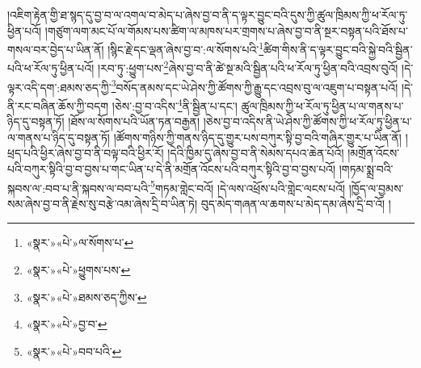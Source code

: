 །འཇིག་རྟེན་གྱི་ཐ་སྙད་དུ་བྱ་བ་ལ་འགལ་བ་མེད་པ་ཞེས་བྱ་བ་ནི་ད་ལྟར་བྱུང་བའི་དུས་ཀྱི་ཚུལ་ཁྲིམས་ཀྱི་ཕ་རོལ་ཏུ་ཕྱིན་པའོ། །གཙུག་ལག་མང་པོ་ལ་གོམས་པས་ཚིག་ལ་མཁས་པར་གྲགས་པ་ཞེས་བྱ་བ་ནི་སྔར་བསྟན་པའི་ཐོས་པ་གསལ་བར་བྱེད་པ་ཡིན་ནོ། །སྙིང་རྗེ་དང་ལྡན་ཞེས་བྱ་བ་:ལ་སོགས་པའི་\footnote{«སྣར་»«པེ་»ལ་སོགས་པ་}ཚིག་གིས་ནི་ད་ལྟར་བྱུང་བའི་སྐྱེ་བའི་སྦྱིན་པའི་ཕ་རོལ་ཏུ་ཕྱིན་པའོ། །རབ་ཏུ་:ཕྱུག་པས་\footnote{«སྣར་»«པེ་»ཕྱུགས་པས་}ཞེས་བྱ་བ་ནི་ཚེ་སྔ་མའི་སྦྱིན་པའི་ཕ་རོལ་ཏུ་ཕྱིན་བའི་འབྲས་བུའོ། །དེ་ལྟར་འདི་དག་:ཐམས་ཅད་ཀྱི་\footnote{«སྣར་»«པེ་»ཐམས་ཅད་ཀྱིས་}བསོད་ནམས་དང་ཡེ་ཤེས་ཀྱི་ཚོགས་ཀྱི་རྒྱུ་དང་འབྲས་བུ་ལ་འཇུག་པ་བསྟན་པའོ། །དེ་ནི་རང་བཞིན་ཆོས་ཀྱི་བདག །ཅེས་:བྱ་བ་འདིས་\footnote{«སྣར་»«པེ་»བྱ་བ་}ནི་སྦྱིན་པ་དང་། ཚུལ་ཁྲིམས་ཀྱི་ཕ་རོལ་ཏུ་ཕྱིན་པ་ལ་གནས་པ་ཉིད་དུ་བསྟན་ཏོ། །ཐོས་ལ་སོགས་པའི་ཡོན་ཏན་བརྒྱན། །ཅེས་བྱ་བ་འདིས་ནི་ཡེ་ཤེས་ཀྱི་ཚོགས་ཀྱི་ཕ་རོལ་ཏུ་ཕྱིན་པ་ལ་གནས་པ་ཉིད་དུ་བསྟན་ཏོ། །ཚོགས་གཉིས་ཀྱི་གནས་ཉིད་དུ་གྱུར་པས་བཀུར་སྟི་བྱ་བའི་གཞིར་གྱུར་པ་ཡིན་ནོ། །ཕྲད་པའི་ཕྱིར་ཞེས་བྱ་བ་ནི་བལྟ་བའི་ཕྱིར་རོ། །དེའི་ཁྱིམ་དུ་ཞེས་བྱ་བ་ནི་སེམས་དཔའ་ཆེན་པོའོ། །མགྲོན་འོངས་པའི་བཀུར་སྟིའི་བྱ་བ་བྱས་པ་གང་ཡིན་པ་དེ་ནི་མགྲོན་འོངས་པའི་བཀུར་སྟིའི་བྱ་བ་བྱས་པའོ། །གཏམ་སྨྲ་བའི་སྐབས་ལ་:བབ་པ་ནི་སྐབས་ལ་བབ་པའི་\footnote{«སྣར་»«པེ་»བབ་པའི་}གཏམ་གླེང་བའོ། །དེ་ལས་འཕྲོས་པའི་གླེང་ལངས་པའོ། །ཁྱོད་ལ་བྱམས་སམ་ཞེས་བྱ་བ་ནི་རྗེས་སུ་བརྩེ་འམ་ཞེས་དྲི་བ་ཡིན་ཏེ། བུད་མེད་གཞན་ལ་ཆགས་པ་མེད་དམ་ཞེས་དྲི་བ་འོ། །

